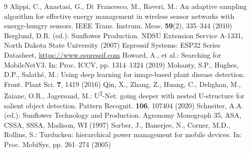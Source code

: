 \documentclass[runningheads]{llncs}
\begin{document}
\begin{thebibliography}{9}
 Alippi, C., Anastasi, G., Di~Francesco, M., Roveri, M.: An adaptive sampling algorithm for effective energy management in wireless sensor networks with energy-hungry sensors. IEEE Trans. Instrum. Meas. \textbf{59}(2), 335--344 (2010)
 Berglund, D.R. (ed.): Sunflower Production. NDSU Extension Service A-1331, North Dakota State University (2007)
 Espressif Systems: ESP32 Series Datasheet, \url{https://www.espressif.com}
 Howard, A., et al.: Searching for MobileNetV3. In: Proc. ICCV, pp. 1314--1324 (2019)
 Mohanty, S.P., Hughes, D.P., Salath\'e, M.: Using deep learning for image-based plant disease detection. Front. Plant Sci. \textbf{7}, 1419 (2016)
 Qin, X., Zhang, Z., Huang, C., Dehghan, M., Zaiane, O.R., Jagersand, M.: U\textsuperscript{2}-Net: going deeper with nested U-structure for salient object detection. Pattern Recognit. \textbf{106}, 107404 (2020)
 Schneiter, A.A. (ed.): Sunflower Technology and Production. Agronomy Monograph 35, ASA, CSSA, SSSA, Madison, WI (1997)
 Sorber, J., Banerjee, N., Corner, M.D., Rollins, S.: Turducken: hierarchical power management for mobile devices. In: Proc. MobiSys, pp. 261--274 (2005)
\end{thebibliography}
\end{document}
